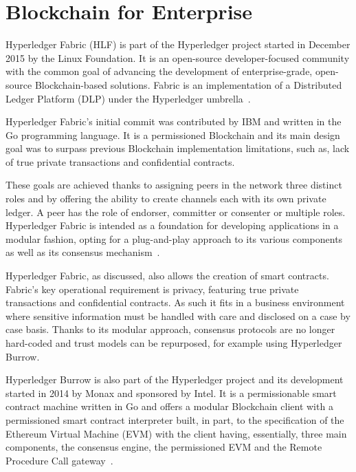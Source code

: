 \section{Blockchain for Enterprise} \label{enterpriseBlockchain}

Hyperledger Fabric (HLF) is part of the Hyperledger project started in December
2015 by the Linux Foundation. It is an open-source developer-focused community
with the common goal of advancing the development of enterprise-grade,
open-source Blockchain-based solutions.  Fabric is an implementation of a
Distributed Ledger Platform (DLP) under the Hyperledger
umbrella~\cite{Cachin2016}.

Hyperledger Fabric’s initial commit was contributed by IBM and written in the
Go programming language.  It is a permissioned Blockchain and its main design
goal was to surpass previous Blockchain implementation limitations, such as,
lack of true private transactions and confidential contracts.

These goals are achieved thanks to assigning peers in the network three
distinct roles and by offering the ability to create channels each with its own
private ledger.  A peer has the role of endorser, committer or consenter or
multiple roles.  Hyperledger Fabric is intended as a foundation for developing
applications in a modular fashion, opting for a plug-and-play approach to its
various components as well as its consensus
mechanism~\cite{HyperledgerFabricDocs2017}.

Hyperledger Fabric, as discussed, also allows the creation of smart contracts.
Fabric's key operational requirement is privacy, featuring true private
transactions and confidential contracts. As such it fits in a business
environment where sensitive information must be handled with care and disclosed
on a case by case basis. Thanks to its modular approach, consensus protocols
are no longer hard-coded and trust models can be repurposed, for example using
Hyperledger Burrow.

Hyperledger Burrow is also part of the Hyperledger project and its development
started in 2014 by Monax and sponsored by Intel. It is a permissionable smart
contract machine written in Go and offers a modular Blockchain client with a
permissioned smart contract interpreter built, in part, to the specification of
the Ethereum Virtual Machine (EVM) with the client having, essentially, three
main components, the consensus engine, the permissioned EVM and the Remote
Procedure Call gateway~\cite{Kuhlman2017,HyperledgerBurrow2017}.


